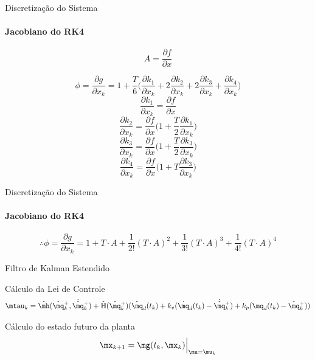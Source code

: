 \documentclass[25pt,landscape]{beamer}
\begin{document}
\begin{frame}{Discretiza\c{c}\~ao do Sistema}
	\framesubtitle{Jacobiano do RK4}
    \begin{block}{}
    	\begin{equation}
    		A = \frac{\partial f}{\partial x}
    	\end{equation}

		\begin{equation}
			\phi = \frac{\partial g}{\partial x_k} = 1 + \frac{T}{6} \Big( \frac{\partial k_1}{\partial x_k} + 2 \frac{\partial k_2}{\partial x_k}  + 2 \frac{\partial k_3}{\partial x_k}  + \frac{\partial k_4}{\partial x_k}  \Big)
		\end{equation}
		\begin{equation}
			\frac{\partial k_1}{\partial x_k}  =  \frac{\partial f}{\partial x}
		\end{equation}
		\begin{equation}
			\frac{\partial k_2}{\partial x_k}  =  \frac{\partial f}{\partial x} \Big( 1 + \frac{T}{2} \frac{\partial k_1}{\partial x_k}  \Big)
		\end{equation}
		\begin{equation}
			\frac{\partial k_3}{\partial x_k}  =  \frac{\partial f}{\partial x} \Big( 1 + \frac{T}{2} \frac{\partial k_3}{\partial x_k}  \Big)
		\end{equation}
		\begin{equation}
			\frac{\partial k_4}{\partial x_k}  =  \frac{\partial f}{\partial x} \Big( 1 + T \frac{\partial k_3}{\partial x_k} \Big)
		\end{equation}
    \end{block}
\end{frame}

\begin{frame}{Discretiza\c{c}\~ao do Sistema}
	\framesubtitle{Jacobiano do RK4}
    \begin{block}{}
    	\begin{equation}
    		\therefore \phi = \frac{\partial g}{\partial x_k} = 1 + T \cdot A + \frac{1}{2!}(T \cdot A)^2 + \frac{1}{3!}(T \cdot A)^3 + \frac{1}{4!}(T \cdot A)^4
    	\end{equation}
    \end{block}
\end{frame}

\begin{frame}{Filtro de Kalman Estendido}
    \begin{block}{C\'alculo da Lei de Controle}
		\begin{equation}
			\mtau_k = \hat{\mh}(\hat{\mq}_k^+,\dot{\hat{\mq}}_k^+) + \hat{\mH}(\hat{\mq}_k^+)( \ddot{\mq}_d(t_k) + k_v (\dot{\mq}_d(t_k) - \dot{\hat{\mq}}_k^+) + k_p (\mq_d(t_k) - \hat{\mq}_k^+)  )
		\end{equation}
    \end{block}
    \begin{block}{C\'alculo do estado futuro da planta}
		\begin{equation}
			\mx_{k+1} = \mg(t_k, \mx_k)\Big|_{\mu = \mu_k}
		\end{equation}
    \end{block}
\end{frame}
\end{document}
